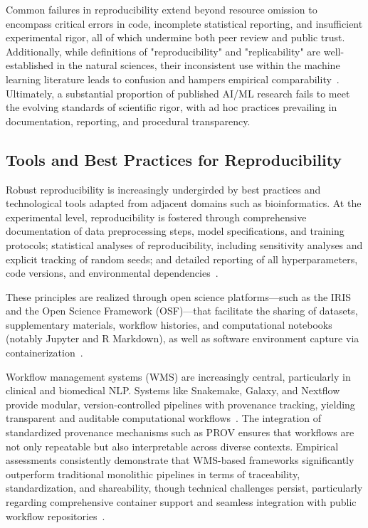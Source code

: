 \documentclass[sigconf]{acmart}
\begin{document}
Common failures in reproducibility extend beyond resource omission to encompass critical errors in code, incomplete statistical reporting, and insufficient experimental rigor, all of which undermine both peer review and public trust. Additionally, while definitions of "reproducibility" and "replicability" are well-established in the natural sciences, their inconsistent use within the machine learning literature leads to confusion and hampers empirical comparability~\cite{ref108}. Ultimately, a substantial proportion of published AI/ML research fails to meet the evolving standards of scientific rigor, with ad hoc practices prevailing in documentation, reporting, and procedural transparency.

\subsection{Tools and Best Practices for Reproducibility}

Robust reproducibility is increasingly undergirded by best practices and technological tools adapted from adjacent domains such as bioinformatics. At the experimental level, reproducibility is fostered through comprehensive documentation of data preprocessing steps, model specifications, and training protocols; statistical analyses of reproducibility, including sensitivity analyses and explicit tracking of random seeds; and detailed reporting of all hyperparameters, code versions, and environmental dependencies~\cite{ref108}.

These principles are realized through open science platforms---such as the IRIS and the Open Science Framework (OSF)---that facilitate the sharing of datasets, supplementary materials, workflow histories, and computational notebooks (notably Jupyter and R Markdown), as well as software environment capture via containerization~\cite{ref108}.

Workflow management systems (WMS) are increasingly central, particularly in clinical and biomedical NLP. Systems like Snakemake, Galaxy, and Nextflow provide modular, version-controlled pipelines with provenance tracking, yielding transparent and auditable computational workflows~\cite{ref12,ref13,ref24,ref25,ref28,ref29,ref32,ref33,ref34,ref39,ref44,ref46,ref50,ref58,ref65}. The integration of standardized provenance mechanisms such as PROV ensures that workflows are not only repeatable but also interpretable across diverse contexts. Empirical assessments consistently demonstrate that WMS-based frameworks significantly outperform traditional monolithic pipelines in terms of traceability, standardization, and shareability, though technical challenges persist, particularly regarding comprehensive container support and seamless integration with public workflow repositories~\cite{ref65}.
\end{document}
